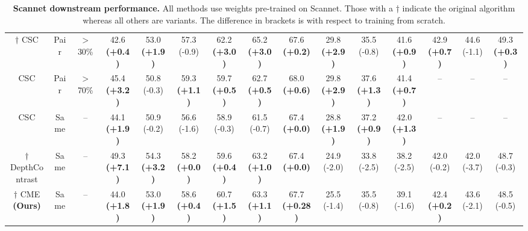 \documentclass[10pt,twocolumn,letterpaper]{article}
\begin{document}
\begin{table}[ht!]
{\begin{tabular}{ c | c c | c c c c c c | c c c c c c |}
            $\dagger$ CSC \cite{hou2021Exploring}               & Pair & $>$ 30\% & 42.6 \textbf{(+0.4)}                               & 53.0 \textbf{(+1.9)}                                  & 57.3 (-0.9)          & 62.2 \textbf{(+3.0)} & 65.2 \textbf{(+3.0)} & 67.6 \textbf{(+0.2)}  & 29.8 \textbf{(+2.9)} & 35.5 (-0.8)          & 41.6 \textbf{(+0.9)} & 42.9 \textbf{(+0.7)} & 44.6 (-1.1) & 49.3 \textbf{(+0.3)} \\
            CSC \cite{hou2021Exploring}                         & Pair & $>$ 70\% & 45.4 \textbf{(+3.2)}                               & 50.8 (-0.3)                                           & 59.3 \textbf{(+1.1)} & 59.7 \textbf{(+0.5)} & 62.7 \textbf{(+0.5)} & 68.0 \textbf{(+0.6)}  & 29.8 \textbf{(+2.9)} & 37.6 \textbf{(+1.3)} & 41.4 \textbf{(+0.7)} & --                   & --          & --                   \\
            CSC \cite{hou2021Exploring}                         & Same & --       & 44.1 \textbf{(+1.9)}                               & 50.9 (-0.2)                                           & 56.6 (-1.6)          & 58.9 (-0.3)          & 61.5 (-0.7)          & 67.4 \textbf{(+0.0)}  & 28.8 \textbf{(+1.9)} & 37.2 \textbf{(+0.9)} & 42.0 \textbf{(+1.3)} & --                   & --          & --                   \\
            $\dagger$ DepthContrast \cite{zhang2021Self}        & Same & --       & 49.3 \textbf{(+7.1)}                               & 54.3 \textbf{(+3.2)}                                  & 58.2 \textbf{(+0.0)} & 59.6 \textbf{(+0.4)} & 63.2 \textbf{(+1.0)} & 67.4 \textbf{(+0.0)}  & 24.9 (-2.0)          & 33.8 (-2.5)          & 38.2 (-2.5)          & 42.0 (-0.2)          & 42.0 (-3.7) & 48.7 (-0.3)          \\
            \hline
            $\dagger$ CME \textbf{(Ours)}                       & Same & --       & 44.0 \textbf{(+1.8)}                               & 53.0 \textbf{(+1.9)}                                  & 58.6 \textbf{(+0.4)} & 60.7 \textbf{(+1.5)} & 63.3 \textbf{(+1.1)} & 67.7 \textbf{(+0.28)} & 25.5 (-1.4)          & 35.5 (-0.8)          & 39.1 (-1.6)          & 42.4 \textbf{(+0.2)} & 43.6 (-2.1) & 48.5 (-0.5)          \\
        \end{tabular}
    }
    \caption{\textbf{Scannet downstream performance.} All methods use weights pre-trained on Scannet. Those with a † indicate the original algorithm whereas all others are variants. The difference in brackets is with respect to training from scratch. }
    \label{table:scannetVaryingDataAmount}
\end{table}
\end{document}
